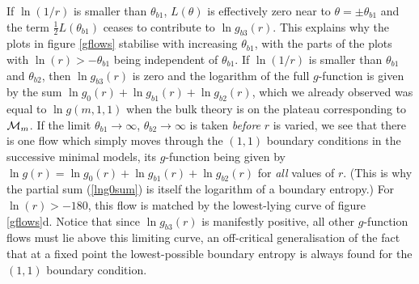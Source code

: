 \documentclass[11pt]{article}
\newcommand\phup{^{\phantom o}}
\newcommand{\CM}{{\cal M}}
\newcommand{\tbi}{\theta_{b1}}
\newcommand{\tbii}{\theta_{b2}}
\newcommand{\go}{g\phup_{0}}
\newcommand{\gi}{g\phup_{b1}}
\newcommand{\gii}{g\phup_{b2}}
\newcommand{\giii}{g\phup_{b3}}
\begin{document}
If $\ln(1/r)$ is smaller than $\tbi$, $L(\theta)$ is
effectively zero near to $\theta=\pm\tbi$ and the term
$\frac{1}{2}L(\tbi)$ ceases to contribute to $\ln\giii(r)$.
This explains why the plots in figure \ref{gflows} stabilise with
increasing $\tbi$, with the parts of the plots
with $\ln(r)>-\tbi$ being independent of $\tbi$.
If $\ln(1/r)$ is smaller than $\tbi$ and $\tbii$,
then $\ln\giii(r)$ is zero and the logarithm of the
full $g$-function is given by the
sum $\ln\go(r)+\ln\gi(r)+\ln\gii(r)$, which we already observed was equal to
$\ln g(m,1,1)$ when the bulk theory is on the plateau
corresponding to $\CM_m$. 
If the limit $\tbi\to\infty$,
$\tbii\to\infty$ is taken {\em before}\/ $r$ is varied, we 
see that there is one flow which simply moves
through the $(1,1)$ boundary conditions in the successive minimal
models, its $g$-function being given by
$\ln g(r)=\ln\go(r)+\ln\gi(r)+\ln\gii(r)$ for {\em all}\/ values of $r$.
(This is why the partial sum
(\ref{lng0sum}) is itself the logarithm of a boundary entropy.)
For $\ln(r)>-180$, this flow is matched by the lowest-lying curve of figure 
\ref{gflows}d. Notice that since $\ln\giii(r)$ is manifestly positive,
all other $g$-function flows must lie above this limiting curve, an
off-critical generalisation of the fact that at a fixed point the
lowest-possible boundary entropy is always found for the $(1,1)$
boundary condition.
\end{document}
